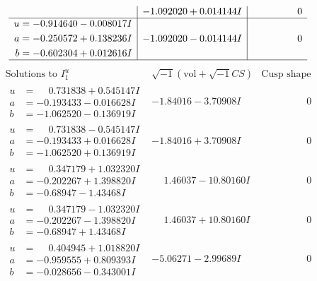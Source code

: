 \documentclass[1p]{elsarticle_modified}
\theoremstyle{definition}
\newcommand{\I}{\sqrt{-1}}
\begin{document}
$$\begin{array}{c|c|c}
 & -1.092020 + 0.014144 I & \phantom{-0.000000 } 0 \\ \hline\begin{aligned}
u &= -0.914640 - 0.008017 I \\
a &= -0.250572 + 0.138236 I \\
b &= -0.602304 + 0.012616 I\end{aligned}
 & -1.092020 - 0.014144 I & \phantom{-0.000000 } 0\\
 \hline 
 \end{array}$$\newpage$$\begin{array}{c|c|c}  
\text{Solutions to }I^u_{1}& \I (\text{vol} + \sqrt{-1}CS) & \text{Cusp shape}\\
 \hline 
\begin{aligned}
u &= \phantom{-}0.731838 + 0.545147 I \\
a &= -0.193433 - 0.016628 I \\
b &= -1.062520 - 0.136919 I\end{aligned}
 & -1.84016 - 3.70908 I & \phantom{-0.000000 } 0 \\ \hline\begin{aligned}
u &= \phantom{-}0.731838 - 0.545147 I \\
a &= -0.193433 + 0.016628 I \\
b &= -1.062520 + 0.136919 I\end{aligned}
 & -1.84016 + 3.70908 I & \phantom{-0.000000 } 0 \\ \hline\begin{aligned}
u &= \phantom{-}0.347179 + 1.032320 I \\
a &= -0.202267 + 1.398820 I \\
b &= -0.68947 - 1.43468 I\end{aligned}
 & \phantom{-}1.46037 - 10.80160 I & \phantom{-0.000000 } 0 \\ \hline\begin{aligned}
u &= \phantom{-}0.347179 - 1.032320 I \\
a &= -0.202267 - 1.398820 I \\
b &= -0.68947 + 1.43468 I\end{aligned}
 & \phantom{-}1.46037 + 10.80160 I & \phantom{-0.000000 } 0 \\ \hline\begin{aligned}
u &= \phantom{-}0.404945 + 1.018820 I \\
a &= -0.959555 + 0.809393 I \\
b &= -0.028656 - 0.343001 I\end{aligned}
 & -5.06271 - 2.99689 I & \phantom{-0.000000 } 0 \\ \hline\begin{aligned}

\end{aligned}
\end{array}$$
\end{document}
